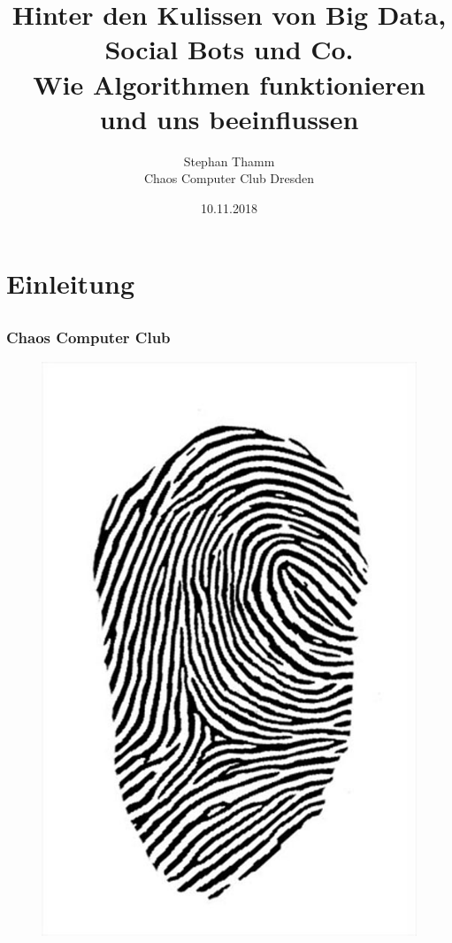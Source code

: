 \documentclass[12pt]{beamer}
\title{\normalsize Hinter den Kulissen von Big Data, Social Bots und Co. \\ Wie Algorithmen funktionieren
und uns beeinflussen}
\author{\small Stephan Thamm\\\large Chaos Computer Club Dresden}
\date{10.11.2018}
\begin{document}
\maketitle

\section{Einleitung}
\subsection{}

\begin{frame}
  \frametitle{Chaos Computer Club}
  \begin{figure}
    \includegraphics[height=0.7\textheight]{img/fingerabdruck.jpg}
  \end{figure}
\end{frame}
\end{document}
